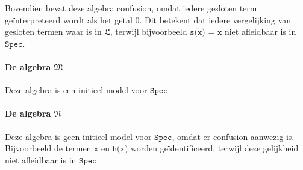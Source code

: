\documentclass[a4paper,11pt]{article}
\begin{document}
\begin{enumerate}
Bovendien bevat deze algebra confusion, omdat iedere gesloten term
ge\"interpreteerd wordt als het getal 0. Dit betekent dat iedere vergelijking
van gesloten termen waar is in $\mathfrak{L}$, terwijl bijvoorbeeld
$\texttt{s(x) = x}$ niet afleidbaar is in $\texttt{Spec}$.

\paragraph{De algebra $\mathfrak{M}$}

Deze algebra is een initieel model voor $\texttt{Spec}$.

\paragraph{De algebra $\mathfrak{N}$}

Deze algebra is geen initieel model voor $\texttt{Spec}$, omdat er
confusion aanwezig is. Bijvoorbeeld de termen $\texttt{x}$ en $\texttt{h(x)}$
worden ge\"identificeerd, terwijl deze gelijkheid niet afleidbaar is in
$\texttt{Spec}$.

\end{enumerate}
\end{document}
